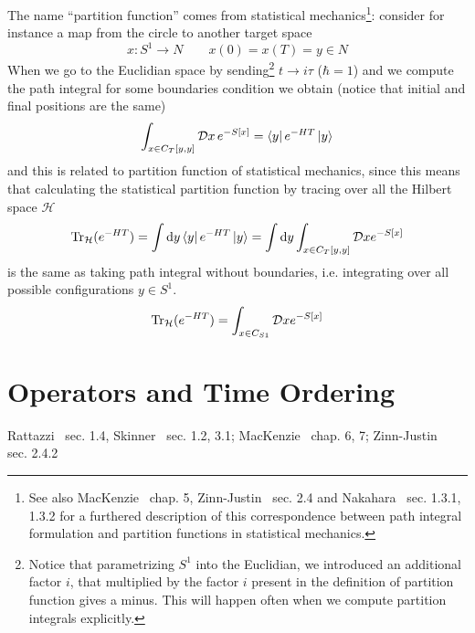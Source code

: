 \documentclass[../main/main.tex]{subfiles}
\begin{document}
The name ``partition function'' comes from statistical mechanics\footnote{See also MacKenzie~\cite{MacKenzie:2000aa} chap. 5, Zinn-Justin~\cite{Zinn-Justin:2002aa} sec. 2.4 and Nakahara~\cite{Nakahara:2003aa} sec. 1.3.1, 1.3.2 for a furthered description of this correspondence between path integral formulation and partition functions in statistical mechanics.}: consider for instance a map from the circle to another target space
\[x:S^1\to N\qquad x(0)=x(T)=y\in N\]
When we go to the Euclidian space by sending\footnote{Notice that parametrizing $S^1$ into the Euclidian, we introduced an additional factor $i$, that multiplied by the factor $i$ present in the definition of partition function gives a minus. This will happen often when we compute partition integrals explicitly.} $t\to i\tau$ ($\hbar =1$) and we compute the path integral for some boundaries condition we obtain (notice that initial and final positions are the same)
\[\int_{x\in C_T[y,y]}\mathcal Dx \,e^{-S[x]}=\bra{y}e^{-HT}\ket {y}\]
and this is related to partition function of statistical mechanics, since this means that calculating the statistical partition function by tracing over all the Hilbert space $\mathcal H$
\[\Tr_{\mathcal H}(e^{-HT})=\int \textup{d} y\bra{y}e^{-HT}\ket{y}=\int\textup{d} y\int_{x\in C_T[y,y]}\mathcal D xe^{-S[x]}\]
is the same as taking path integral without boundaries, i.e. integrating over all possible configurations $y\in S^1$. 
\[\Tr_{\mathcal H}(e^{-HT})=\int_{x\in C_{S1}}\mathcal Dxe^{-S[x]}\]


\section{Operators and Time Ordering}
\textsf{Rattazzi~\cite{Rattazzi:2011aa} sec. 1.4, Skinner~\cite{Skinner:2018aa} sec. 1.2, 3.1; MacKenzie~\cite{MacKenzie:2000aa} chap. 6, 7; Zinn-Justin~\cite{Zinn-Justin:2002aa} sec. 2.4.2}\\
\end{document}
